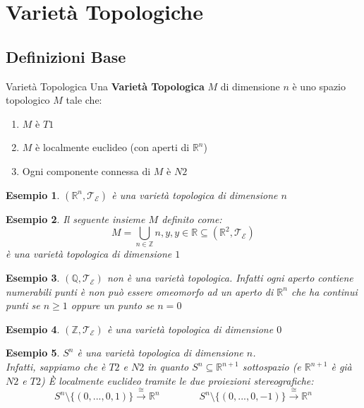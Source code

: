 \documentclass[11pt,a4paper,twoside]{article}
\newtheorem{es}{Esempio}
\theoremstyle{definition}
\begin{document}
\newpage

\section{Varietà Topologiche}

\subsection{Definizioni Base}

\begin{defn}{Varietà Topologica}{}
	Una \textbf{Varietà Topologica} $M$ di dimensione $n$ è uno spazio topologico $M$ tale che:
	\begin{enumerate}
		\item $M$ è $T1$
		\item $M$ è localmente euclideo (con aperti di $\mathbb R^n$)
		\item Ogni componente connessa di $M$ è $N2$
	\end{enumerate}
\end{defn}

\begin{es}
	$(\mathbb R^n, \mathcal T_\mathcal E)$ è una varietà topologica di dimensione $n$
\end{es}

\begin{es}
	Il seguente insieme $M$ definito come:
	\[ M = \bigcup_{n \in \mathbb Z}{n,y}, y \in \mathbb R \subseteq (\mathbb R^2, \mathcal T_\mathcal E)\] è una varietà topologica di dimensione $1$
\end{es}

\begin{es}
	$(\mathbb Q, \mathcal T_\mathcal E)$ non è una varietà topologica. Infatti ogni aperto contiene numerabili punti è non può essere omeomorfo ad un aperto di $\mathbb R^n$ che ha continui punti se $n\geq 1$ oppure un punto se $n = 0$
\end{es}

\begin{es}
	$(\mathbb Z, \mathcal T_\mathcal E)$ è una varietà topologica di dimensione $0$
\end{es}

\begin{es}
	$S^n$ è una varietà topologica di dimensione $n$.\\
	Infatti, sappiamo che è $T2$ e $N2$ in quanto $S^n \subseteq \mathbb R^{n+1}$ sottospazio (e $\mathbb R^{n+1}$ è già $N2$ e $T2$) È localmente euclideo tramite le due proiezioni stereografiche:
	\[ S^n \setminus\{(0,...,0,1)\} \xrightarrow{\cong}\mathbb R^n\qquad \qquad S^n\setminus\{(0,...,0,-1)\} \xrightarrow{\cong} \mathbb R^n \]
\end{es}
\end{document}
